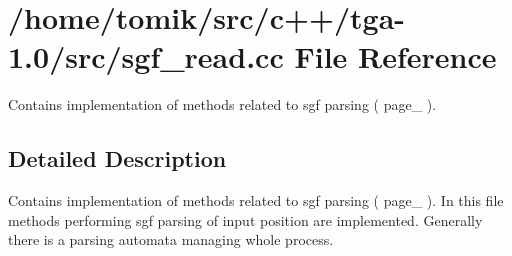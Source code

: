 \section{/home/tomik/src/c++/tga-\/1.0/src/sgf\_\-read.cc File Reference}
\label{sgf__read_8cc}


Contains implementation of methods related to sgf parsing ( page\_ ).  




\subsection{Detailed Description}
Contains implementation of methods related to sgf parsing ( page\_ ). In this file methods performing sgf parsing of input position are implemented. Generally there is a parsing automata managing whole process. 